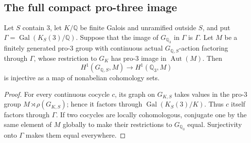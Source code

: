 \subsection{The full compact pro-three image}
\begin{proposition}\label{prop:nonabelian-source-localization}
Let $S$ contain $3$, let $K/\mathbb Q$ be finite Galois and unramified
outside $S$, and put $\Gamma=\operatorname{Gal}(K_S(3)/\mathbb Q)$.
Suppose that the image of $G_{\mathbb Q_3}$ in $\Gamma$ is $\Gamma$.
Let $M$ be a finitely generated pro-$3$ group with continuous actual
$G_{\mathbb Q,S}$-action factoring through $\Gamma$, whose restriction
to $G_K$ has pro-$3$ image in $\operatorname{Aut}(M)$.
Then
\[
 H^1(G_{\mathbb Q,S},M)\longrightarrow H^1(\mathbb Q_3,M)
\]
is injective as a map of nonabelian cohomology sets.
\end{proposition}
\begin{proof}
For every continuous cocycle $c$, its graph on $G_{K,S}$ takes values
in the pro-$3$ group $M\rtimes\rho(G_{K,S})$; hence it factors through
$\operatorname{Gal}(K_S(3)/K)$. Thus $c$ itself factors through
$\Gamma$. If two cocycles are locally cohomologous, conjugate one by
the same element of $M$ globally to make their restrictions to
$G_{\mathbb Q_3}$ equal. Surjectivity onto $\Gamma$ makes them equal
everywhere.
\end{proof}

